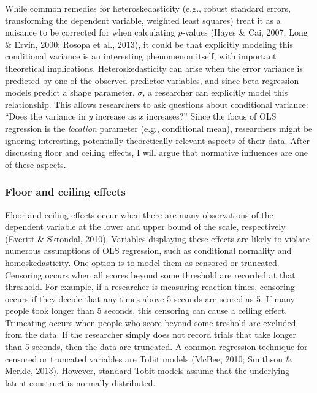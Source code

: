 \documentclass[english,,man]{apa6}
\begin{document}
While common remedies for heteroskedasticity (e.g., robust standard errors, transforming the dependent variable, weighted least squares) treat it as a nuisance to be corrected for when calculating \(p\)-values (Hayes \& Cai, 2007; Long \& Ervin, 2000; Rosopa et al., 2013), it could be that explicitly modeling this conditional variance is an interesting phenomenon itself, with important theoretical implications. Heteroskedasticity can arise when the error variance is predicted by one of the observed predictor variables, and since beta regression models predict a shape parameter, \(\sigma\), a researcher can explicitly model this relationship. This allows researchers to ask questions about conditional variance: \enquote{Does the variance in \(y\) increase as \(x\) increases?} Since the focus of OLS regression is the \emph{location} parameter (e.g., conditional mean), researchers might be ignoring interesting, potentially theoretically-relevant aspects of their data. After discussing floor and ceiling effects, I will argue that normative influences are one of these aspects.

\hypertarget{floor-and-ceiling-effects}{%
\subsubsection{Floor and ceiling effects}\label{floor-and-ceiling-effects}}

Floor and ceiling effects occur when there are many observations of the dependent variable at the lower and upper bound of the scale, respectively (Everitt \& Skrondal, 2010). Variables displaying these effects are likely to violate numerous assumptions of OLS regression, such as conditional normality and homoskedasticity. One option is to model them as censored or truncated. Censoring occurs when all scores beyond some threshold are recorded at that threshold. For example, if a researcher is measuring reaction times, censoring occurs if they decide that any times above 5 seconds are scored as 5. If many people took longer than 5 seconds, this censoring can cause a ceiling effect. Truncating occurs when people who score beyond some treshold are excluded from the data. If the researcher simply does not record trials that take longer than 5 seconds, then the data are truncated. A common regression technique for censored or truncated variables are Tobit models (McBee, 2010; Smithson \& Merkle, 2013). However, standard Tobit models assume that the underlying latent construct is normally distributed.
\end{document}
